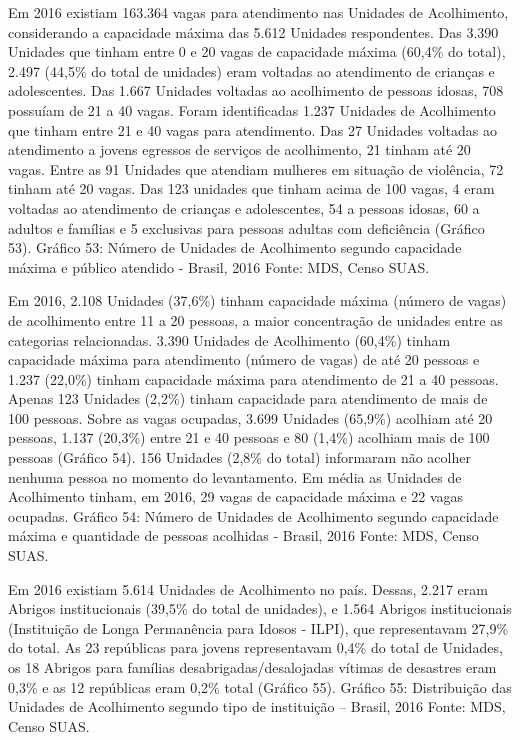 \documentclass[
  brazilian]{report}
\begin{document}
Em 2016 existiam 163.364 vagas para atendimento nas Unidades de
Acolhimento, considerando a capacidade máxima das 5.612 Unidades
respondentes. Das 3.390 Unidades que tinham entre 0 e 20 vagas de
capacidade máxima (60,4\% do total), 2.497 (44,5\% do total de unidades)
eram voltadas ao atendimento de crianças e adolescentes. Das 1.667
Unidades voltadas ao acolhimento de pessoas idosas, 708 possuíam de 21 a
40 vagas. Foram identificadas 1.237 Unidades de Acolhimento que tinham
entre 21 e 40 vagas para atendimento. Das 27 Unidades voltadas ao
atendimento a jovens egressos de serviços de acolhimento, 21 tinham até
20 vagas. Entre as 91 Unidades que atendiam mulheres em situação de
violência, 72 tinham até 20 vagas. Das 123 unidades que tinham acima de
100 vagas, 4 eram voltadas ao atendimento de crianças e adolescentes, 54
a pessoas idosas, 60 a adultos e famílias e 5 exclusivas para pessoas
adultas com deficiência (Gráfico 53). Gráfico 53: Número de Unidades de
Acolhimento segundo capacidade máxima e público atendido - Brasil, 2016
Fonte: MDS, Censo SUAS.

Em 2016, 2.108 Unidades (37,6\%) tinham capacidade máxima (número de
vagas) de acolhimento entre 11 a 20 pessoas, a maior concentração de
unidades entre as categorias relacionadas. 3.390 Unidades de Acolhimento
(60,4\%) tinham capacidade máxima para atendimento (número de vagas) de
até 20 pessoas e 1.237 (22,0\%) tinham capacidade máxima para
atendimento de 21 a 40 pessoas. Apenas 123 Unidades (2,2\%) tinham
capacidade para atendimento de mais de 100 pessoas. Sobre as vagas
ocupadas, 3.699 Unidades (65,9\%) acolhiam até 20 pessoas, 1.137
(20,3\%) entre 21 e 40 pessoas e 80 (1,4\%) acolhiam mais de 100 pessoas
(Gráfico 54). 156 Unidades (2,8\% do total) informaram não acolher
nenhuma pessoa no momento do levantamento. Em média as Unidades de
Acolhimento tinham, em 2016, 29 vagas de capacidade máxima e 22 vagas
ocupadas. Gráfico 54: Número de Unidades de Acolhimento segundo
capacidade máxima e quantidade de pessoas acolhidas - Brasil, 2016
Fonte: MDS, Censo SUAS.

Em 2016 existiam 5.614 Unidades de Acolhimento no país. Dessas, 2.217
eram Abrigos institucionais (39,5\% do total de unidades), e 1.564
Abrigos institucionais (Instituição de Longa Permanência para Idosos -
ILPI), que representavam 27,9\% do total. As 23 repúblicas para jovens
representavam 0,4\% do total de Unidades, os 18 Abrigos para famílias
desabrigadas/desalojadas vítimas de desastres eram 0,3\% e as 12
repúblicas eram 0,2\% total (Gráfico 55). Gráfico 55: Distribuição das
Unidades de Acolhimento segundo tipo de instituição -- Brasil, 2016
Fonte: MDS, Censo SUAS.
\end{document}
